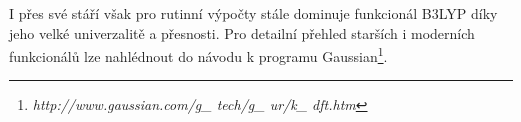 
I přes své stáří však pro rutinní výpočty stále dominuje funkcionál B3LYP díky jeho velké univerzalitě a přesnosti.
Pro detailní přehled starších i moderních funkcionálů lze nahlédnout do návodu k programu Gaussian\footnote{\textit{http://www.gaussian.com/g\_ tech/g\_ ur/k\_ dft.htm}}.

